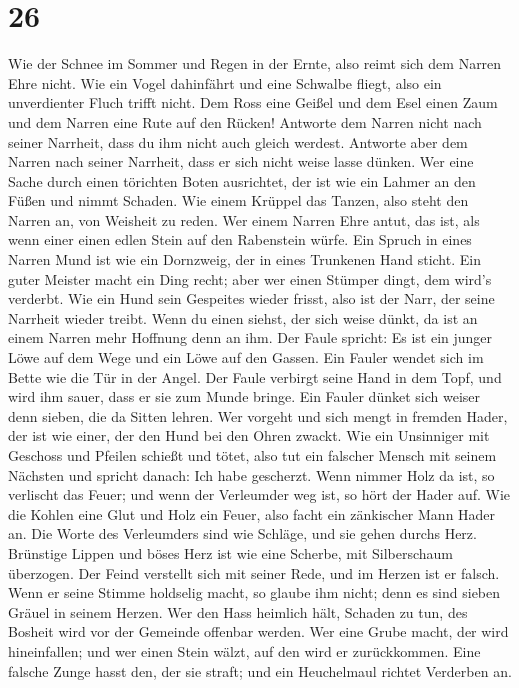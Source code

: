 \hypertarget{section-25}{%
\section{26}\label{section-25}}

 Wie der Schnee im Sommer und Regen in der Ernte, also
reimt sich dem Narren Ehre nicht.  Wie ein Vogel
dahinfährt und eine Schwalbe fliegt, also ein unverdienter Fluch trifft
nicht.  Dem Ross eine Geißel und dem Esel einen Zaum und
dem Narren eine Rute auf den Rücken!  Antworte dem Narren
nicht nach seiner Narrheit, dass du ihm nicht auch gleich werdest.
 Antworte aber dem Narren nach seiner Narrheit, dass er
sich nicht weise lasse dünken.  Wer eine Sache durch einen
törichten Boten ausrichtet, der ist wie ein Lahmer an den Füßen und
nimmt Schaden.  Wie einem Krüppel das Tanzen, also steht
den Narren an, von Weisheit zu reden.  Wer einem Narren
Ehre antut, das ist, als wenn einer einen edlen Stein auf den Rabenstein
würfe.  Ein Spruch in eines Narren Mund ist wie ein
Dornzweig, der in eines Trunkenen Hand sticht.  Ein guter
Meister macht ein Ding recht; aber wer einen Stümper dingt, dem wird's
verderbt.  Wie ein Hund sein Gespeites wieder frisst,
also ist der Narr, der seine Narrheit wieder treibt. 
Wenn du einen siehst, der sich weise dünkt, da ist an einem Narren mehr
Hoffnung denn an ihm.  Der Faule spricht: Es ist ein
junger Löwe auf dem Wege und ein Löwe auf den Gassen. 
Ein Fauler wendet sich im Bette wie die Tür in der Angel.
 Der Faule verbirgt seine Hand in dem Topf, und wird ihm
sauer, dass er sie zum Munde bringe.  Ein Fauler dünket
sich weiser denn sieben, die da Sitten lehren.  Wer
vorgeht und sich mengt in fremden Hader, der ist wie einer, der den Hund
bei den Ohren zwackt.  Wie ein Unsinniger mit Geschoss
und Pfeilen schießt und tötet,  also tut ein falscher
Mensch mit seinem Nächsten und spricht danach: Ich habe gescherzt.
 Wenn nimmer Holz da ist, so verlischt das Feuer; und
wenn der Verleumder weg ist, so hört der Hader auf.  Wie
die Kohlen eine Glut und Holz ein Feuer, also facht ein zänkischer Mann
Hader an.  Die Worte des Verleumders sind wie Schläge,
und sie gehen durchs Herz.  Brünstige Lippen und böses
Herz ist wie eine Scherbe, mit Silberschaum überzogen. 
Der Feind verstellt sich mit seiner Rede, und im Herzen ist er falsch.
 Wenn er seine Stimme holdselig macht, so glaube ihm
nicht; denn es sind sieben Gräuel in seinem Herzen.  Wer
den Hass heimlich hält, Schaden zu tun, des Bosheit wird vor der
Gemeinde offenbar werden.  Wer eine Grube macht, der wird
hineinfallen; und wer einen Stein wälzt, auf den wird er zurückkommen.
 Eine falsche Zunge hasst den, der sie straft; und ein
Heuchelmaul richtet Verderben an.


